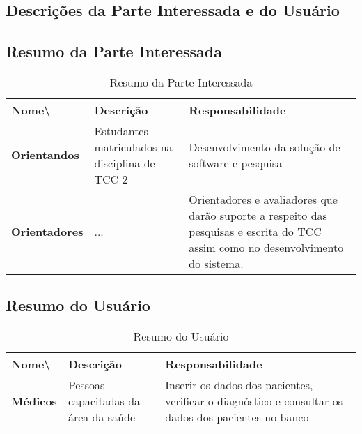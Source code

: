 \begin{anexosenv}
\section{Descrições da Parte Interessada e do Usuário}

\subsection{Resumo da Parte Interessada}

    \begin{table}[]
        \centering
        \caption{Resumo da Parte Interessada}
        \begin{tabular}{@{}|l|l|l|@{}}
        \toprule
        \textbf{Nome\textbackslash{}} & \textbf{Descrição}                             & \textbf{Responsabilidade}                                                                                                        \\ \midrule
        \textbf{Orientandos}          & Estudantes matriculados na disciplina de TCC 2 & Desenvolvimento da solução de software e pesquisa                                                                                \\ \midrule
        \textbf{Orientadores}         & ...                                            & Orientadores e avaliadores que darão suporte a respeito das pesquisas e escrita do TCC assim como no desenvolvimento do sistema. \\ \bottomrule
        \end{tabular}
        \label{table:Resumo da Parte Interessada}
    \end{table}

\subsection{Resumo do Usuário}

    \begin{table}[]
        \centering
        \caption{Resumo do Usuário}
        \begin{tabular}{@{}|l|l|l|@{}}
        \toprule
        \textbf{Nome\textbackslash{}} & \textbf{Descrição}                   & \textbf{Responsabilidade}                                                                           \\ \midrule
        \textbf{Médicos}              & Pessoas capacitadas da área da saúde & Inserir os dados dos pacientes, verificar o diagnóstico e consultar os dados dos pacientes no banco \\ \bottomrule
        \end{tabular}
        \label{table:Resumo do Usuário}
    \end{table}


\end{anexosenv}

